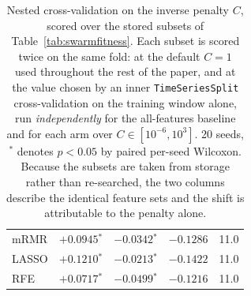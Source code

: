 \begin{table}[htbp]
\begin{tabular}{lrrrr}
    mRMR & $+0.0945$$^{*}$ & $-0.0342$$^{*}$ & $-0.1286$ & 11.0 \\
    LASSO & $+0.1210$$^{*}$ & $-0.0213$$^{*}$ & $-0.1422$ & 11.0 \\
    RFE & $+0.0717$$^{*}$ & $-0.0499$$^{*}$ & $-0.1216$ & 11.0 \\
    \hline
    \end{tabular}
    \caption{Nested cross-validation on the inverse penalty $C$, scored over the stored subsets of Table~\ref{tab:swarmfitness}. Each subset is scored twice on the same fold: at the default $C = 1$ used throughout the rest of the paper, and at the value chosen by an inner \texttt{TimeSeriesSplit} cross-validation on the training window alone, run \emph{independently} for the all-features baseline and for each arm over $C \in [10^{-6}, 10^{3}]$. 20 seeds, $^{*}$ denotes $p < 0.05$ by paired per-seed Wilcoxon. Because the subsets are taken from storage rather than re-searched, the two columns describe the identical feature sets and the shift is attributable to the penalty alone.}
    \label{tab:nestedcv}
\end{table}
